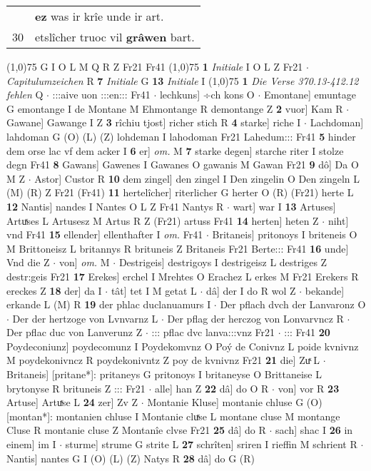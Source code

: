 \documentclass[8pt,a4paper,notitlepage]{article}
\begin{document}
\begin{table}[ht]
\begin{minipage}[t]{0.5\linewidth}
\begin{tabular}{rl}
 & \textbf{ez} was ir krîe unde ir art.\\ 
30 & etslîcher truoc vil \textbf{grâwen} bart.\\ 
\end{tabular}
\scriptsize
\line(1,0){75} \newline
G I O L M Q R Z Fr21 Fr41 \newline
\line(1,0){75} \newline
\textbf{1} \textit{Initiale} I O L Z Fr21   $\cdot$ \textit{Capitulumzeichen} R  \textbf{7} \textit{Initiale} G  \textbf{13} \textit{Initiale} I  \newline
\line(1,0){75} \newline
\textbf{1} \textit{Die Verse 370.13-412.12 fehlen} Q   $\cdot$ :::aive uon :::en::: Fr41  $\cdot$ lechkuns] ÷ch kons O  $\cdot$ Emontane] emuntage G emontange I de Montane M Ehmontange R demontange Z \textbf{2} vuor] Kam R  $\cdot$ Gawane] Gawange I Z \textbf{3} rîchiu tjost] richer stich R \textbf{4} starke] riche I  $\cdot$ Lachdoman] lahdoman G (O) (L) (Z) lohdeman I lahodoman Fr21 Lahedum::: Fr41 \textbf{5} hinder dem orse lac vf dem acker I \textbf{6} er] \textit{om.} M \textbf{7} starke degen] starche riter I stolze degn Fr41 \textbf{8} Gawans] Gawenes I Gawanes O gawanis M Gawan Fr21 \textbf{9} dô] Da O M Z  $\cdot$ Astor] Custor R \textbf{10} dem zingel] den zingel I Den zingelin O Den zingeln L (M) (R) Z Fr21 (Fr41) \textbf{11} hertelîcher] riterlicher G herter O (R) (Fr21) herte L \textbf{12} Nantis] nandes I Nantes O L Z Fr41 Nantys R  $\cdot$ wart] war I \textbf{13} Artuses] Artuͯses L Artusesz M Artus R Z (Fr21) artuss Fr41 \textbf{14} herten] heten Z  $\cdot$ niht] vnd Fr41 \textbf{15} ellender] ellenthafter I \textit{om.} Fr41  $\cdot$ Britaneis] pritonoys I briteneis O M Brittoneisz L britannys R brituneis Z Britaneis Fr21 Berte::: Fr41 \textbf{16} unde] Vnd die Z  $\cdot$ von] \textit{om.} M  $\cdot$ Destrigeis] destrigoys I destrigeisz L destriges Z destr:geis Fr21 \textbf{17} Erekes] erchel I Mrehtes O Erachez L erkes M Fr21 Erekers R ereckes Z \textbf{18} der] da I  $\cdot$ tât] tet I M getat L  $\cdot$ dâ] der I do R wol Z  $\cdot$ bekande] erkande L (M) R \textbf{19} der phlac duclanuamurs I  $\cdot$ Der pflach dvch der Lanvaronz O  $\cdot$ Der der hertzoge von Lvnvarnz L  $\cdot$ Der pflag der herczog von Lonvarvncz R  $\cdot$ Der pflac duc von Lanverunz Z  $\cdot$ ::: pflac dvc lanva:::vnz Fr21  $\cdot$ ::: Fr41 \textbf{20} Poydeconiunz] poydecomunz I Poydekomvnz O Poý de Conivnz L poide kvnivnz M poydekonivncz R poydekonivntz Z poy de kvnivnz Fr21 \textbf{21} die] Zuͯ L  $\cdot$ Britaneis] [pritane*]: pritaneys G pritonoys I britaneyse O Brittaneise L brytonyse R brituneis Z ::: Fr21  $\cdot$ alle] han Z \textbf{22} dâ] do O R  $\cdot$ von] vor R \textbf{23} Artuse] Artuͯse L \textbf{24} zer] Zv Z  $\cdot$ Montanie Kluse] montanie chluse G (O) [montan*]: montanien chluse I Montanie cluͯse L montane cluse M montange Cluse R montanie cluse Z Montanîe clvse Fr21 \textbf{25} dâ] do R  $\cdot$ sach] shac I \textbf{26} in einem] im I  $\cdot$ sturme] strume G strite L \textbf{27} schrîten] sriren I rieffin M schrient R  $\cdot$ Nantis] nantes G I (O) (L) (Z) Natys R \textbf{28} dâ] do G (R)  
\end{minipage}
\end{table}
\end{document}
